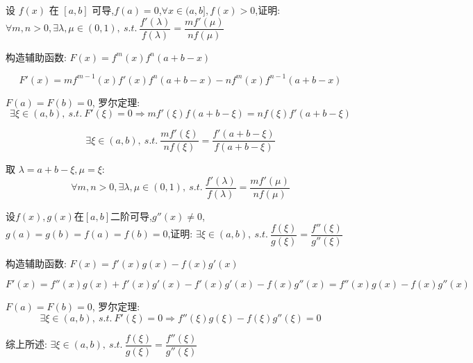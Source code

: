 \begin{proposition}
	设 $f(x)$ 在 $[a,b]$ 可导,$f(a)=0$,$\forall x\in(a,b],f(x)>0$,证明: $\forall m,n>0,\exists \lambda,\mu\in(0,1),\ s.t.\ \dfrac{f'(\lambda)}{f(\lambda)}=\dfrac{mf'(\mu)}{nf(\mu)}$
\end{proposition}
\begin{solution}

	构造辅助函数: $F(x)=f^{m}(x)f^{n}(a+b-x)$

	$$F'(x)=mf^{m-1}(x)f'(x)f^{n}(a+b-x)-nf^{m}(x)f^{n-1}(a+b-x)$$

	$F(a) = F(b) = 0$, 罗尔定理:
	$$\exists\xi\in(a,b),\ s.t.\ F'(\xi)=0\Rightarrow mf'(\xi)f(a+b-\xi)=nf(\xi)f'(a+b-\xi)$$

	$$\exists\xi\in(a,b),\ s.t.\ \dfrac{mf'(\xi)}{nf(\xi)}=\dfrac{f'(a+b-\xi)}{f(a+b-\xi)}$$

	取 $\lambda=a+b-\xi, \mu=\xi$:
	$$\forall m,n>0,\exists \lambda,\mu\in(0,1),\ s.t.\ \dfrac{f'(\lambda)}{f(\lambda)}=\dfrac{mf'(\mu)}{nf(\mu)}$$
\end{solution}

\begin{proposition}
	设$f(x),g(x)$在$[a,b]$二阶可导,$g''(x)\neq 0$,$g(a)=g(b)=f(a)=f(b)=0$,证明: $\exists \xi\in(a,b),\ s.t.\ \dfrac{f(\xi)}{g(\xi)}=\dfrac{f''(\xi)}{g''(\xi)}$
\end{proposition}
\begin{solution}

	构造辅助函数: $F(x)=f'(x)g(x)-f(x)g'(x)$

	$$F'(x)=f''(x)g(x)+f'(x)g'(x)-f'(x)g'(x)-f(x)g''(x)=f''(x)g(x)-f(x)g''(x)$$

	$F(a) = F(b) = 0$, 罗尔定理:
	$$\exists\xi\in(a,b),\ s.t.\ F'(\xi)=0\Rightarrow f''(\xi)g(\xi)-f(\xi)g''(\xi)=0$$

	综上所述: $\exists \xi\in(a,b),\ s.t.\ \dfrac{f(\xi)}{g(\xi)}=\dfrac{f''(\xi)}{g''(\xi)}$
\end{solution}

